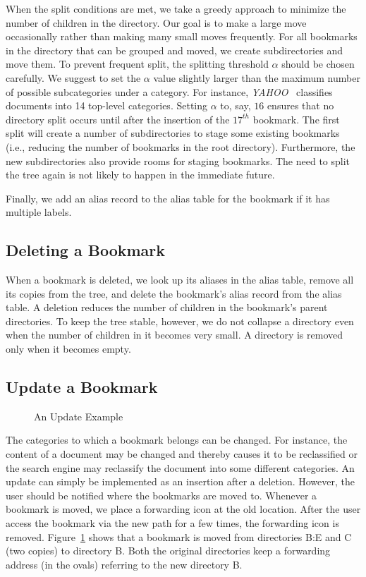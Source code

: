 When the split conditions are met, we take a greedy approach to 
minimize the number of children in the directory.
Our goal is to make a large move occasionally
rather than making many small moves frequently. 
For all bookmarks in the directory 
that can be grouped and moved, we create subdirectories 
and move them. To prevent frequent split, the splitting
threshold $\alpha$ should be chosen carefully.
We suggest to set the $\alpha$ value slightly larger
than the maximum number of possible subcategories under a category.
For instance, {\it YAHOO}~ classifies documents into 14 top-level
categories. Setting $\alpha$ to, say, $16$ ensures that
no directory split occurs until after the insertion of the $17^{th}$ bookmark.
The first split will create a number of subdirectories
to stage some existing bookmarks (i.e., reducing the number
of bookmarks in the root directory). Furthermore, 
the new subdirectories also provide rooms for staging 
bookmarks. The need
to split the tree again is not likely to happen in
the immediate future.

Finally, we add an alias record to the alias table for
the bookmark if it has multiple labels.

\subsection{Deleting a Bookmark}

When a bookmark is deleted, we 
look up its aliases in the alias table, remove
all its copies from the tree, and delete the
bookmark's alias record from the alias table.
A deletion reduces the number of children 
in the bookmark's parent directories. To keep
the tree stable, however, we do not
collapse a directory even when the
number of children in it becomes very small. 
A directory is removed only when it becomes empty.

\subsection{Update a Bookmark}

\begin{figure}[t]
\epsfysize=180pt
\epsfxsize=320pt
\centerline{}
\caption{An Update Example}
\label{fig-update}
\end{figure}

The categories to which a bookmark belongs can be changed.
For instance, the content of a document may be changed and thereby
causes it to be reclassified or the search engine may 
reclassify the document into some different categories.
An update can simply be implemented as
an insertion after a deletion. However, the user
should be notified where the bookmarks are moved to.
Whenever a bookmark is moved, we place a forwarding
icon at the old location. 
After the user access the bookmark via the
new path for a few times, the forwarding icon is
removed. Figure~\ref{fig-update} shows that a bookmark
is moved from directories B:E and C (two copies)
to directory B. Both the original directories keep
a forwarding address (in the ovals) referring
to the new directory B.

